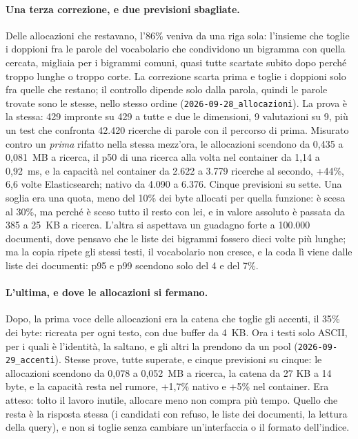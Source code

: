 \paragraph{Una terza correzione, e due previsioni sbagliate.} Delle allocazioni
che restavano, l'86\% veniva da una riga sola: l'insieme che toglie i doppioni
fra le parole del vocabolario che condividono un bigramma con quella cercata,
migliaia per i bigrammi comuni, quasi tutte scartate subito dopo perché troppo
lunghe o troppo corte. La correzione scarta prima e toglie i doppioni solo fra
quelle che restano; il controllo dipende solo dalla parola, quindi le parole
trovate sono le stesse, nello stesso ordine
(\texttt{2026-09-28\_allocazioni}). La prova è la stessa: 429 impronte su 429
a tutte e due le dimensioni, 9 valutazioni su 9, più un test che confronta
42.420 ricerche di parole con il percorso di prima. Misurato contro un
\emph{prima} rifatto nella stessa mezz'ora, le allocazioni scendono da 0,435 a
0,081~MB a ricerca, il p50 di una ricerca alla volta nel container da 1,14 a
0,92~ms, e la capacità nel container da 2.622 a 3.779 ricerche al secondo,
+44\%, 6,6 volte Elasticsearch; nativo da 4.090 a 6.376. Cinque
previsioni su sette. Una soglia era una quota, meno del 10\% dei byte allocati
per quella funzione: è scesa al 30\%, ma perché è sceso tutto il resto con lei,
e in valore assoluto è passata da 385 a 25~KB a ricerca. L'altra si aspettava
un guadagno forte a 100.000 documenti, dove pensavo che le liste dei bigrammi
fossero dieci volte più lunghe; ma la copia ripete gli stessi testi, il
vocabolario non cresce, e la coda lì viene dalle liste dei documenti: p95 e p99
scendono solo del 4 e del 7\%.

\paragraph{L'ultima, e dove le allocazioni si fermano.} Dopo, la prima voce
delle allocazioni era la catena che toglie gli accenti, il 35\% dei byte:
ricreata per ogni testo, con due buffer da 4~KB. Ora i testi solo ASCII, per i
quali è l'identità, la saltano, e gli altri la prendono da un pool
(\texttt{2026-09-29\_accenti}). Stesse prove, tutte superate, e cinque
previsioni su cinque: le allocazioni scendono da 0,078 a 0,052~MB a ricerca, la
catena da 27 KB a 14 byte, e la capacità resta nel rumore, +1,7\% nativo e
+5\% nel container. Era atteso: tolto il lavoro inutile, allocare meno non
compra più tempo. Quello che resta è la risposta stessa (i candidati con
refuso, le liste dei documenti, la lettura della query), e non si toglie senza
cambiare un'interfaccia o il formato dell'indice.

